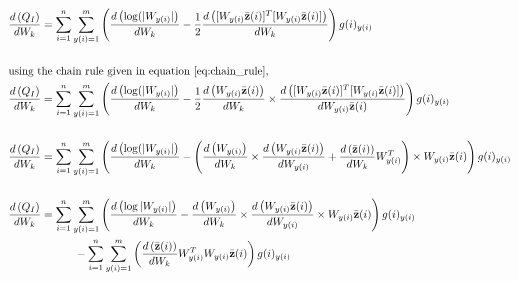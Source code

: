 \documentclass[]{article}
\begin{document}
\begin{align*}
& \der{W_k}{Q_I} = \sum\limits_{i=1}^n \sum\limits_{y(i)=1}^m \left( \der{W_k}{\log(|W_{y(i)}|} - \frac{1}{2}\der{W_k}{ [W_{y(i)}\zbar{i}]^T [W_{y(i)}\zbar{i}] }\right)g(i)_{y(i)} \\ \\
&\text{using the chain rule given in equation \ref{eq:chain_rule},}  \\
& \der{W_k}{Q_I} = \sum\limits_{i=1}^n \sum\limits_{y(i)=1}^m \left( \der{W_k}{\log(|W_{y(i)}|} - \frac{1}{2} \der{W_k}{W_{y(i)}\zbar{i}} \times \der{W_{y(i)}\zbar{i}}{ [W_{y(i)}\zbar{i}]^T [W_{y(i)}\zbar{i}] }\right)g(i)_{y(i)} \\ \\
& \der{W_k}{Q_I} = \sum\limits_{i=1}^n \sum\limits_{y(i)=1}^m \left( \der{W_k}{\log(|W_{y(i)}|} - \left( \der{W_k}{W_{y(i)}} \times \der{W_{y(i)}}{W_{y(i)}\zbar{i}} + \der{W_k}{\zbar{i}}W_{y(i)}^T\right) \times W_{y(i)}\zbar{i}  \right)g(i)_{y(i)} \\ \\
& \der{W_k}{Q_I} = \sum\limits_{i=1}^n \sum\limits_{y(i)=1}^m \left( \der{W_k}{\log|W_{y(i)}|} -  \der{W_k}{W_{y(i)}} \times \der{W_{y(i)}}{W_{y(i)}\zbar{i}}\times W_{y(i)}\zbar{i}  \right)g(i)_{y(i)}  \\ 
& \qquad \qquad \qquad - \sum\limits_{i=1}^n \sum\limits_{y(i)=1}^m \left( \der{W_k}{\zbar{i}}W_{y(i)}^T  W_{y(i)}\zbar{i} \right) g(i)_{y(i)} \\ \\
\end{align*}
\end{document}
